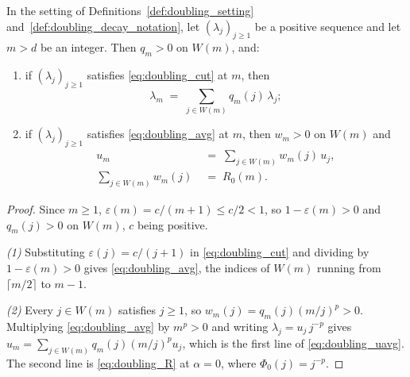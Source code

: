 \begin{lemma}\label{lem:doubling_averaging}
In the setting of Definitions~\ref{def:doubling_setting} and~\ref{def:doubling_decay_notation},
let $(\lambda_j)_{j\geq1}$ be a positive sequence and let $m>d$ be an integer. Then $q_m>0$ on
$W(m)$, and:
\begin{enumerate}
    \item if $(\lambda_j)_{j\geq1}$ satisfies \eqref{eq:doubling_cut} at $m$, then
    \begin{equation}\label{eq:doubling_avg}
        \lambda_m\;=\;\sum_{j\in W(m)}q_m(j)\,\lambda_j ;
    \end{equation}
    \item if $(\lambda_j)_{j\geq1}$ satisfies \eqref{eq:doubling_avg} at $m$, then $w_m>0$ on
    $W(m)$ and
    \begin{equation}\label{eq:doubling_uavg}
    \begin{aligned}
        u_m\;&=\;\sum_{j\in W(m)}w_m(j)\,u_j,\\
        \sum_{j\in W(m)}w_m(j)\;&=\;R_0(m) .
    \end{aligned}
    \end{equation}
\end{enumerate}
\end{lemma}

\begin{proof}
Since $m\geq1$, $\varepsilon(m)=c/(m+1)\leq c/2<1$, so $1-\varepsilon(m)>0$ and $q_m(j)>0$ on
$W(m)$, $c$ being positive.

\emph{(1)} Substituting $\varepsilon(j)=c/(j+1)$ in \eqref{eq:doubling_cut} and dividing by
$1-\varepsilon(m)>0$ gives \eqref{eq:doubling_avg}, the indices of $W(m)$ running from
$\lceil m/2\rceil$ to $m-1$.

\emph{(2)} Every $j\in W(m)$ satisfies $j\geq1$, so $w_m(j)=q_m(j)(m/j)^{p}>0$. Multiplying
\eqref{eq:doubling_avg} by $m^{p}>0$ and writing $\lambda_j=u_j\,j^{-p}$ gives
$u_m=\sum_{j\in W(m)}q_m(j)(m/j)^{p}u_j$, which is the first line of \eqref{eq:doubling_uavg}.
The second line is \eqref{eq:doubling_R} at $\alpha=0$, where $\Phi_0(j)=j^{-p}$.
\end{proof}

